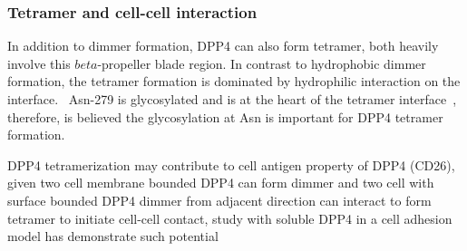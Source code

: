 \subsubsection{Tetramer and cell-cell interaction}

In addition to dimmer formation, DPP4 can also form tetramer, both heavily involve this $beta$-propeller blade region. In contrast to hydrophobic dimmer formation, the tetramer formation is dominated by hydrophilic interaction on the interface.~\cite{Engel_2003} Asn-279 is glycosylated and is at the heart of the tetramer interface~\cite{Engel_2003}, therefore, is believed the glycosylation at Asn is important for DPP4 tetramer formation. 
\par 
DPP4 tetramerization may contribute to cell antigen property of DPP4 (CD26), given two cell membrane bounded DPP4 can form dimmer and two cell with surface bounded DPP4 dimmer from adjacent direction can interact to form tetramer to initiate cell-cell contact, study with soluble DPP4 in a cell adhesion model has demonstrate such potential
